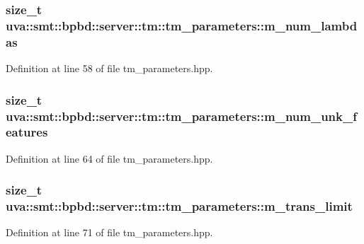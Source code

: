 \subsubsection[{m\+\_\+num\+\_\+lambdas}]{\setlength{\rightskip}{0pt plus 5cm}size\+\_\+t uva\+::smt\+::bpbd\+::server\+::tm\+::tm\+\_\+parameters\+::m\+\_\+num\+\_\+lambdas}\label{structuva_1_1smt_1_1bpbd_1_1server_1_1tm_1_1tm__parameters_a19d5ff875562172e6249e96947fe6002}


Definition at line 58 of file tm\+\_\+parameters.\+hpp.

\hypertarget{structuva_1_1smt_1_1bpbd_1_1server_1_1tm_1_1tm__parameters_a40a41b7331f9f582eeeb0a6d9629aac5}{}
\subsubsection[{m\+\_\+num\+\_\+unk\+\_\+features}]{\setlength{\rightskip}{0pt plus 5cm}size\+\_\+t uva\+::smt\+::bpbd\+::server\+::tm\+::tm\+\_\+parameters\+::m\+\_\+num\+\_\+unk\+\_\+features}\label{structuva_1_1smt_1_1bpbd_1_1server_1_1tm_1_1tm__parameters_a40a41b7331f9f582eeeb0a6d9629aac5}


Definition at line 64 of file tm\+\_\+parameters.\+hpp.

\hypertarget{structuva_1_1smt_1_1bpbd_1_1server_1_1tm_1_1tm__parameters_aca1973cf0099cb3cb94ddff5d52be20f}{}
\subsubsection[{m\+\_\+trans\+\_\+limit}]{\setlength{\rightskip}{0pt plus 5cm}size\+\_\+t uva\+::smt\+::bpbd\+::server\+::tm\+::tm\+\_\+parameters\+::m\+\_\+trans\+\_\+limit}\label{structuva_1_1smt_1_1bpbd_1_1server_1_1tm_1_1tm__parameters_aca1973cf0099cb3cb94ddff5d52be20f}


Definition at line 71 of file tm\+\_\+parameters.\+hpp.

